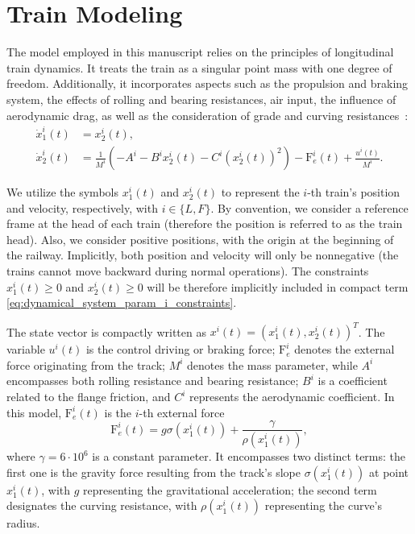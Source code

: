 \documentclass[letterpaper, 10 pt, conference]{ieeeconf}
\theoremstyle{definition}
\theoremstyle{nopoint}
\begin{document}
 \section{Train Modeling}
 \label{sec:TrainModeling}

The model employed in this manuscript relies on the principles of longitudinal train dynamics. It treats the train as a singular point mass with one degree of freedom. Additionally, it incorporates aspects such as the propulsion and braking system, the effects of rolling and bearing resistances, air input, the influence of aerodynamic drag, as well as the consideration of grade and curving resistances~\cite{ltdModel}:
%
  \begin{align}  \label{eq:stateDynamic}
 \dot{x}_1^i (t) &= x_2^i(t),  \nonumber \\
  \dot{x}_2^i(t) &= \frac{1}{M^i}(-A^i-B^i x_2^i(t) -  C^i (x_2^i(t))^2)-\mathrm{F}_e^i(t) + \frac{u^i(t)}{M^i}.
\end{align}
%

We utilize the symbols ${x}_1^i(t)$ and ${x}_2^i(t)$ to represent the $i$-th train's position and velocity, respectively, with $i\in\{L, F\}$. By convention, we consider a reference frame at the head of each train (therefore the position is referred to as the train head). 
Also, we consider positive positions, with the origin at the beginning of the railway. Implicitly, both position and velocity will only be nonnegative (the trains cannot move backward during normal operations). The constraints ${x}_1^i(t)\geq 0$ and ${x}_2^i(t)\geq 0$ will be therefore implicitly included in compact term \eqref{eq:dynamical_system_param_i_constraints}.
 
The state vector is compactly written as {$x^i(t)=(x_1^i(t),x_2^i(t))^T$}.
The variable $u^i(t)$ is the control driving or braking force; $\mathrm{F}_e^i$ denotes the external force originating from the track; $M^i$ denotes the mass parameter, while $A^i$ encompasses both rolling resistance and bearing resistance; $B^i$ is a coefficient related to the flange friction, and $C^i$ represents the aerodynamic coefficient.
%
In this model, $\mathrm{F}^i_e(t)$ is the $i$-th external force
%
\begin{equation*}
\mathrm{F}_e^i(t) = g \sigma(x_1^i(t)) + \frac{\gamma}{\rho(x_1^i(t))}, 
\end{equation*}
%
where $\gamma=6\cdot10^6$ is a constant parameter. It encompasses two distinct terms: the first one is the gravity force resulting from the track's slope $\sigma(x_1^i(t))$  at point $x_1^i(t)$, with $g$ representing the gravitational acceleration; the second term designates the curving resistance, with ${\rho(x_1^i(t))}$ representing the curve's radius.
\end{document}
